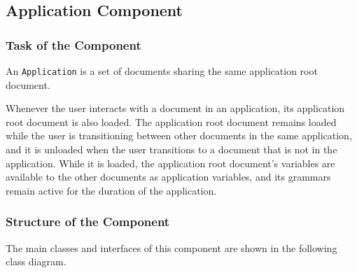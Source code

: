 \documentclass[11pt,a4paper]{article}
\begin{document}
\subsection{Application Component}

\subsubsection{Task of the Component}

An \texttt{Application} is a set of documents sharing the same 
application root document.

Whenever the user interacts with a document in an application, its
application root document is also loaded. The application root document
remains loaded while the user is transitioning between other documents in the
same application, and it is unloaded when the user transitions to a document
that is not in the application. While it is loaded, the application root
document's variables are available to the other documents as application
variables, and its grammars remain active for the duration of the
application.

\subsubsection{Structure of the Component}

The main classes and interfaces of this component are shown in the following
class diagram.

\begin{center}
\end{center}
\end{document}
